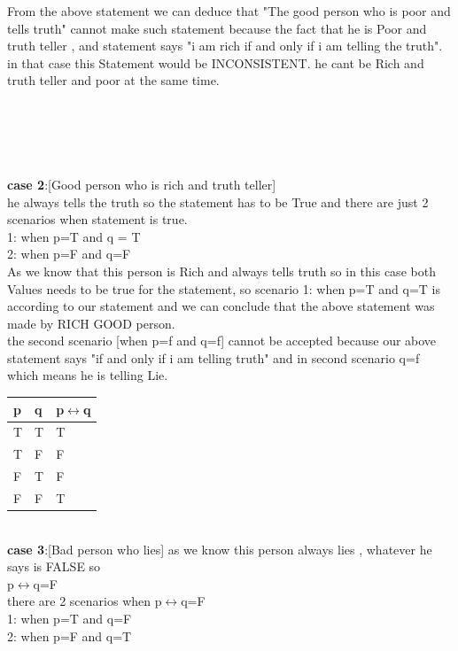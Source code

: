 \documentclass[12pt,a4paper]{article}
\begin{document}
{From the above statement we can deduce that "The good person who is poor and tells truth" cannot make such statement because the fact that he is Poor and truth teller , and statement says "i am rich if and only if i am telling the truth". in that case this Statement would be INCONSISTENT. he cant be Rich and truth teller and poor at the same time.
\\
\\
\\
\\
\\
\\

\textbf{case 2}:[Good person who is rich and truth teller]\\

he always tells the truth so the statement has to be True and there are just 2 scenarios when statement is true.\\

1: when p=T  and q = T \\
2: when p=F and q=F \\

As we know that this person is Rich and always tells truth so in this case both Values needs to be true for the statement, so scenario 1: when p=T and q=T is according to our statement and we can conclude that the above statement was made by RICH GOOD person.\\
the second scenario [when p=f and q=f] cannot be accepted because our above statement says "if and only if i am telling truth" and in second scenario q=f which means he is telling Lie.
\begin{tabular} {|l|l||l|}
	
	\hline
	\hline
	p&q&	p$\leftrightarrow$q \\
	\hline
	\hline

	T&T&T \\
	T&F&F \\
	F&T&F \\
	F&F&T \\
	
	
\end{tabular}\\


	\textbf{case 3}:[Bad person who lies]
	as we know this person always lies , whatever he says is FALSE so\\
	p$\leftrightarrow$q=F\\
	there are 2 scenarios when 	p$\leftrightarrow$q=F\\
	1: when p=T and q=F\\
	2: when p=F and q=T \\
	
}
\end{document}
